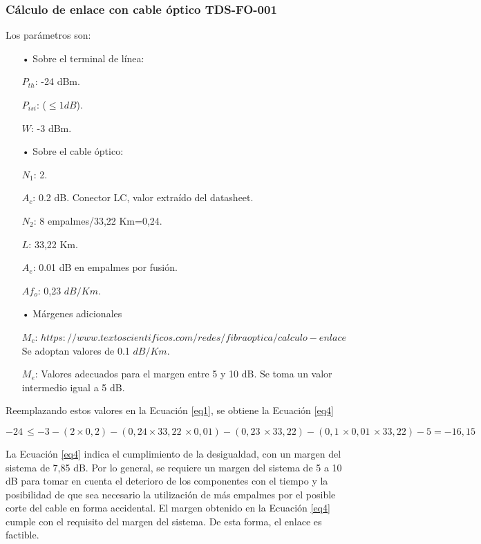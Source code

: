 \subsubsection{Cálculo de enlace con cable óptico TDS-FO-001}



Los parámetros son:
\begin{enumerate}
\item[•] Sobre el terminal de línea:

$P_{th}$: -24 dBm.

$P_{isi}$: ($\leq 1dB$).

$W$: -3 dBm.

\item[•] Sobre el cable óptico:

$N_1$: 2.

$A_c$: 0.2 dB. Conector LC, valor extraído del datasheet.

$N_2$: 8 empalmes/33,22 Km=0,24.

$L$: 33,22 Km.

$A_e$: 0.01 dB en empalmes por fusión.

$Af_o$: 0,23 $dB/Km$.


\item[•] Márgenes adicionales

$M_c$: $https://www.textoscientificos.com/redes/fibraoptica/calculo-enlace$ Se adoptan valores de 0.1 $dB/Km$.

$M_e$: Valores adecuados para el margen entre 5 y 10 dB. Se toma un valor intermedio igual a 5 dB.



\end{enumerate}
Reemplazando estos valores en la Ecuación \ref{eq1}, se obtiene la Ecuación \ref{eq4}

\begin{equation} \label{eq4}
-24\,\leq -3-(2\times 0,2)-(0,24\times 33,22\,\times 0,01)-(0,23\,\times 33,22)-(0,1\,\times 0,01\,\times 33,22)-5=-16,15
\end{equation}

La Ecuación \ref{eq4} indica el cumplimiento de la desigualdad, con un margen del sistema de 7,85 dB. Por lo general, se requiere un margen del sistema de 5 a 10 dB para tomar en cuenta el deterioro de los componentes con el tiempo y la posibilidad de que sea necesario la utilización de más empalmes por el posible corte del cable en forma accidental. El margen obtenido en la Ecuación \ref{eq4} cumple con el requisito del margen del sistema. De esta forma, el enlace es factible.



